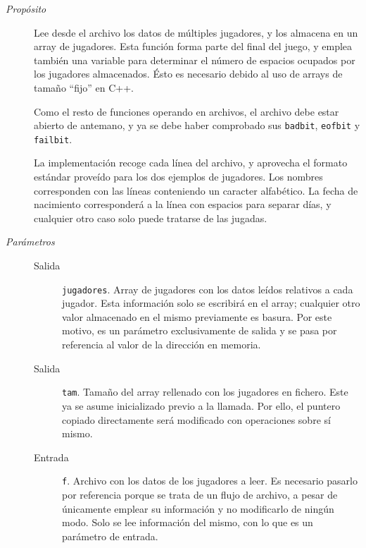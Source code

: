 \documentclass[12pt]{article}
\begin{document}
\begin{description}

\item[\emph{Propósito}]

Lee desde el archivo los datos de múltiples jugadores, y los almacena en un
array de jugadores. Esta función forma parte del final del juego, y emplea
también una variable para determinar el número de espacios ocupados por los
jugadores almacenados. Ésto es necesario debido al uso de arrays de tamaño
``fijo'' en C++.

Como el resto de funciones operando en archivos, el archivo debe estar abierto
de antemano, y ya se debe haber comprobado sus \texttt{badbit},
\texttt{eofbit} y \texttt{failbit}.

La implementación recoge cada línea del archivo, y aprovecha el formato estándar
proveído para los dos ejemplos de jugadores. Los nombres corresponden con las
líneas conteniendo un caracter alfabético. La fecha de nacimiento corresponderá
a la línea con espacios para separar días, y cualquier otro caso solo puede
tratarse de las jugadas.

\item[\emph{Parámetros}] \leavevmode

\begin{description}

\item[Salida] \texttt{jugadores}. Array de jugadores con los datos
leídos relativos a cada jugador. Esta información solo se escribirá en el array;
cualquier otro valor almacenado en el mismo previamente es basura. Por este
motivo, es un parámetro exclusivamente de salida y se pasa por referencia al
valor de la dirección en memoria.

\item[Salida] \texttt{tam}. Tamaño del array rellenado con los
jugadores en fichero. Este ya se asume inicializado previo a la llamada. Por
ello, el puntero copiado directamente será modificado con operaciones sobre sí
mismo.

\item[Entrada] \texttt{f}. Archivo con los datos de los jugadores a
leer. Es necesario pasarlo por referencia porque se trata de un flujo de
archivo, a pesar de únicamente emplear su información y no modificarlo de ningún
modo. Solo se lee información del mismo, con lo que es un parámetro de entrada.

\end{description}

\end{description}
\end{document}
